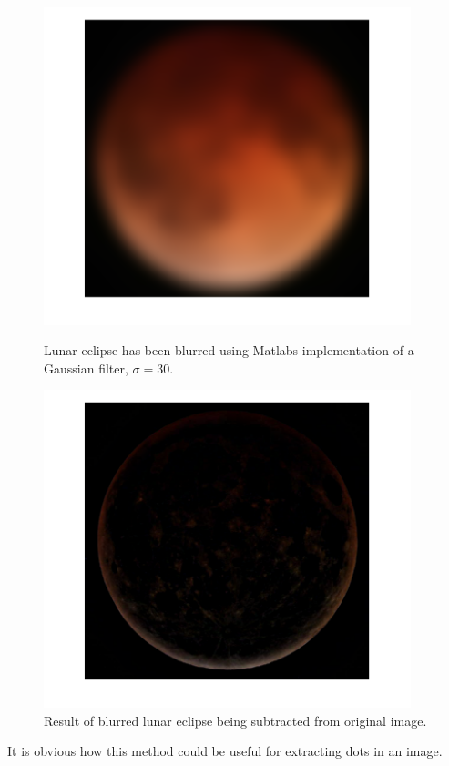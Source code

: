 \begin{figure}[h!]
\begin{minipage}[t]{0.3\textwidth}
        \includegraphics[width=0.95\textwidth]{figures/ImageAnalysis/planet_blur30.png}
        \caption{Lunar eclipse has been blurred using Matlabs implementation of a Gaussian filter, $\sigma = 30$.}
    \label{fig:planet_blurr}
    \end{minipage}%
    \hspace{.02\textwidth}
    \begin{minipage}[t]{0.3\textwidth}
        \centering
        \includegraphics[width=0.95\textwidth]{figures/ImageAnalysis/planet_difference.png}
        \caption{Result of blurred lunar eclipse being subtracted from original image.}
        \label{fig:planet_diff}
    \end{minipage}
\end{figure}
\FloatBarrier
It is obvious how this method could be useful for extracting dots in an image.\\

